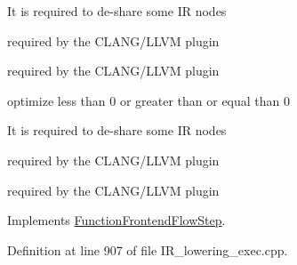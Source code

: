 It is required to de-\/share some IR nodes

required by the C\+L\+A\+N\+G/\+L\+L\+VM plugin

required by the C\+L\+A\+N\+G/\+L\+L\+VM plugin

optimize less than 0 or greater than or equal than 0

It is required to de-\/share some IR nodes

required by the C\+L\+A\+N\+G/\+L\+L\+VM plugin

required by the C\+L\+A\+N\+G/\+L\+L\+VM plugin 

Implements \hyperlink{classFunctionFrontendFlowStep_a00612f7fb9eabbbc8ee7e39d34e5ac68}{Function\+Frontend\+Flow\+Step}.



Definition at line 907 of file I\+R\+\_\+lowering\+\_\+exec.\+cpp.



